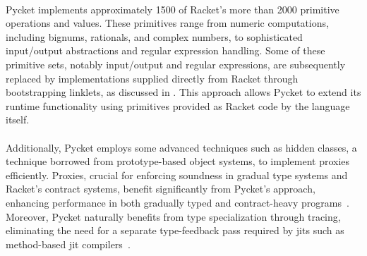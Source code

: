         \paragraph{}%
            Pycket implements approximately 1500 of Racket’s more than 2000 primitive operations and values. These primitives range from numeric computations, including bignums, rationals, and complex numbers, to sophisticated input/output abstractions and regular expression handling. Some of these primitive sets, notably input/output and regular expressions, are subsequently replaced by implementations supplied directly from Racket through bootstrapping linklets, as discussed in . This approach allows Pycket to extend its runtime functionality using primitives provided as Racket code by the language itself.

        \paragraph{}%
            Additionally, Pycket employs some advanced techniques such as hidden classes, a technique borrowed from prototype-based object systems, to implement proxies efficiently. Proxies, crucial for enforcing soundness in gradual type systems and Racket’s contract systems, benefit significantly from Pycket’s approach, enhancing performance in both gradually typed and contract-heavy programs~\cite{findler-felleisen:2002,pycketmain2}. Moreover, Pycket naturally benefits from type specialization through tracing, eliminating the need for a separate type-feedback pass required by \glspl{jit} such as method-based \gls{jit} compilers~\cite{typeSpecial:2009}.

